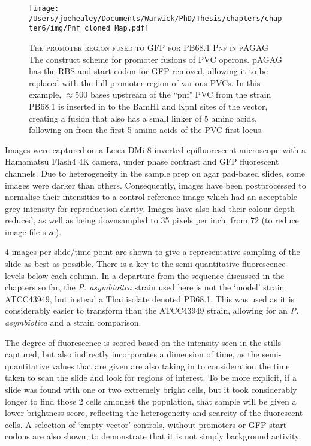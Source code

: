 \begin{figure}[h]
    \texttt{[image: /Users/joehealey/Documents/Warwick/PhD/Thesis/chapters/chapter6/img/Pnf\_cloned\_Map.pdf]}
    \captionsetup{singlelinecheck=off, justification=justified, font=footnotesize, aboveskip=10pt}
    \caption[Example of promoter fusions for PVC operons]{\textsc{\normalsize The promoter region fused to GFP for \Pasy{} PB68.1 Pnf in pAGAG} \vspace{0.1cm} \newline The construct scheme for promoter fusions of PVC operons. pAGAG has the RBS and start codon for GFP removed, allowing it to be replaced with the full promoter region of various PVCs. In this example, $\approx$500 bases upstream of the ``pnf" PVC from the \Pasy{} strain PB68.1 is inserted in to the BamHI and KpnI sites of the vector, creating a fusion that also has a small linker of 5 amino acids, following on from the first 5 amino acids of the PVC first locus.}
\label{reportermaps}
\end{figure}




Images were captured on a Leica DMi-8 inverted epifluorescent microscope with a Hamamatsu Flash4 4K camera, under phase contrast and GFP fluorescent channels. Due to heterogeneity in the sample prep on agar pad-based slides, some images were darker than others. Consequently, images have been postprocessed to normalise their intensities to a control reference image which had an acceptable grey intensity for reproduction clarity. Images have also had their colour depth reduced, as well as being downsampled to 35 pixels per inch, from 72 (to reduce image file size).

4 images per slide/time point are shown to give a representative sampling of the slide as best as possible. There is a key to the semi-quantitative fluorescence levels below each column. In a departure from the sequence discussed in the chapters so far, the \emph{P. asymbioitca} strain used here is not the `model' strain ATCC43949, but instead a Thai isolate denoted PB68.1. This was used as it is considerably easier to transform than the ATCC43949 strain, allowing for an \emph{P. asymbiotica} and a \Plum{} strain comparison.

The degree of fluorescence is scored based on the intensity seen in the stills captured, but also indirectly incorporates a dimension of time, as the semi-quantitative values that are given are also taking in to consideration the time taken to scan the slide and look for regions of interest. To be more explicit, if a slide was found with one or two extremely bright cells, but it took considerably longer to find those 2 cells amongst the population, that sample will be given a lower brightness score, reflecting the heterogeneity and scarcity of the fluorescent cells. A selection of `empty vector' controls, without promoters or GFP start codons are also shown, to demonstrate that it is not simply background activity.

